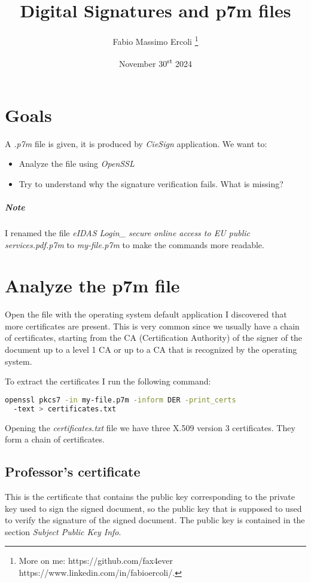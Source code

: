\documentclass{article}
\title{Digital Signatures and p7m files}
\author{Fabio Massimo Ercoli
	\footnote{
		More on me:
		https://github.com/fax4ever
		https://www.linkedin.com/in/fabioercoli/.
}}
\date{November 30\textsuperscript{st} 2024}
\begin{document}
\maketitle
\thispagestyle{empty}

\section{Goals}

A  \emph{.p7m} file is given, it is produced by \emph{CieSign} application.
We want to:
\begin{itemize}
	\item Analyze the file using \emph{OpenSSL}
	\item Try to understand why the signature verification fails. What is missing?
\end{itemize}

\subparagraph{Note}

I renamed the file \emph{eIDAS Login\_ secure online access to EU public services.pdf.p7m}
to \emph{my-file.p7m} to make the commands more readable. 
	
\section{Analyze the p7m file}

Open the file with the operating system default application I discovered that more certificates
are present. This is very common since we usually  have a chain of certificates,
starting from the CA (Certification Authority) of the signer of the document up to a level 1 CA
or up to a CA that is recognized by the operating system.

To extract the certificates I run the following command:

\begin{lstlisting}[language=bash]
openssl pkcs7 -in my-file.p7m -inform DER -print_certs 
  -text > certificates.txt
\end{lstlisting}

Opening the \emph{certificates.txt} file we have three X.509 version 3 certificates.
They form a chain of certificates.

\subsection{Professor's certificate}

This is the certificate that contains the public key corresponding to the private key
used to sign the signed document, so the public key that is supposed to used 
to verify the signature of the signed document.
The public key is contained in the section \emph{Subject Public Key Info}.
\end{document}
